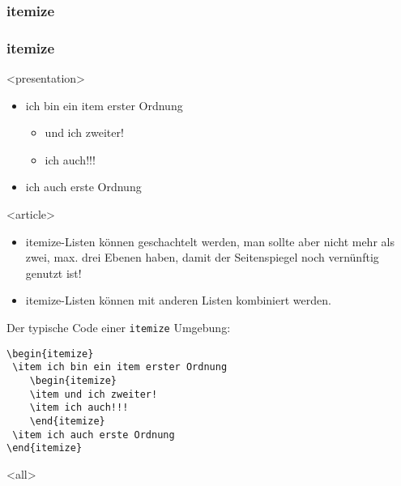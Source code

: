 \subsubsection{itemize}
\begin{frame}[fragile]
\frametitle<presentation>{itemize}


\mode
<presentation>

\begin{itemize}
 \item ich bin ein item erster Ordnung
	\begin{itemize}
	\item und ich zweiter!
 	\item ich auch!!!
	\end{itemize}
 \item ich auch erste Ordnung
\end{itemize}


\mode
<article>

\begin{itemize}
 \item itemize-Listen können geschachtelt werden, man sollte aber nicht mehr als zwei, max. drei Ebenen haben, damit der Seitenspiegel noch vernünftig genutzt ist!
\item itemize-Listen können mit anderen Listen kombiniert werden.
\end{itemize}

Der typische Code einer \verb+itemize+ Umgebung:

\begin{lstlisting}
\begin{itemize}
 \item ich bin ein item erster Ordnung
	\begin{itemize}
	\item und ich zweiter!
 	\item ich auch!!!
	\end{itemize}
 \item ich auch erste Ordnung
\end{itemize}
\end{lstlisting}



\mode
<all>

\end{frame}

\newpage
